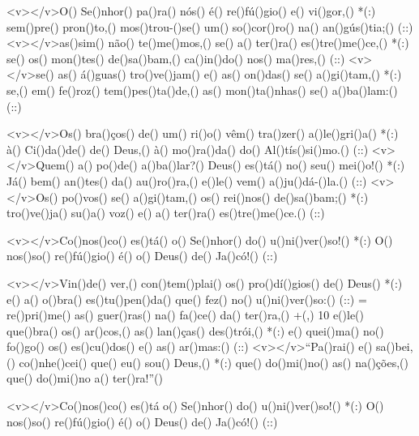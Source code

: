 <v></v>O() Se()nhor() pa()ra() nós() é() re()fú()gio() e() vi()gor,() *(:)
sem()pre() pron()to,() mos()trou-()se() um() so()cor()ro() na() an()gús()tia;() (::)
<v></v>as()sim() não() te()me()mos,() se() a() ter()ra() es()tre()me()ce,() *(:)
se() os() mon()tes() de()sa()bam,() ca()in()do() nos() ma()res,() (::)
<v></v>se() as() á()guas() tro()ve()jam() e() as() on()das() se() a()gi()tam,() *(:)
se,() em() fe()roz() tem()pes()ta()de,() as() mon()ta()nhas() se() a()ba()lam:() (::)

<v></v>Os() bra()ços() de() um() ri()o() vêm() tra()zer() a()le()gri()a() *(:)
à() Ci()da()de() de() Deus,() à() mo()ra()da() do() Al()tís()si()mo.() (::)
<v></v>Quem() a() po()de() a()ba()lar?() Deus() es()tá() no() seu() mei()o!() *(:)
Já() bem() an()tes() da() au()ro()ra,() e()le() vem() a()ju()dá-()la.() (::)
<v></v>Os() po()vos() se() a()gi()tam,() os() rei()nos() de()sa()bam;() *(:)
tro()ve()ja() su()a() voz() e() a() ter()ra() es()tre()me()ce.() (::)

<v></v>Co()nos()co() es()tá() o() Se()nhor() do() u()ni()ver()so!() *(:)
O() nos()so() re()fú()gio() é() o() Deus() de() Ja()có!() (::)

<v></v>Vin()de() ver,() con()tem()plai() os() pro()dí()gios() de() Deus() *(:)
e() a() o()bra() es()tu()pen()da() que() fez() no() u()ni()ver()so:() (::)
= re()pri()me() as() guer()ras() na() fa()ce() da() ter()ra,() +(,)
10 e()le() que()bra() os() ar()cos,() as() lan()ças() des()trói,() *(:)
e() quei()ma() no() fo()go() os() es()cu()dos() e() as() ar()mas:() (::)
<v></v>``Pa()rai() e() sa()bei,() co()nhe()cei() que() eu() sou() Deus,() *(:)
que() do()mi()no() as() na()ções,() que() do()mi()no a() ter()ra!''()

<v></v>Co()nos()co() es()tá o() Se()nhor() do() u()ni()ver()so!() *(:)
O() nos()so() re()fú()gio() é() o() Deus() de() Ja()có!() (::)